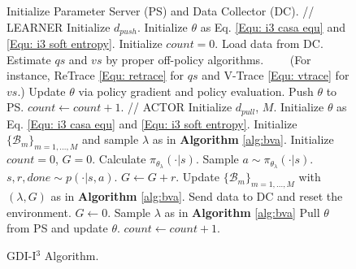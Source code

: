 \documentclass[nohyperref]{article}
\theoremstyle{plain}
\begin{document}
\begin{figure}[ht]
  \centering
  \begin{minipage}{.7\linewidth}
    \begin{algorithm}[H]
      \caption{GDI-I$^3$ Algorithm.}  
          \begin{algorithmic}
            \STATE Initialize Parameter Server (PS) and Data Collector (DC).
            \STATE
            \STATE // LEARNER
            \STATE Initialize $d_{push}$.
            \STATE Initialize $\theta$ as Eq. \eqref{Equ: i3 casa equ} and \eqref{Equ: i3 soft entropy}.
            \STATE Initialize $count = 0$.
                \STATE Load data from DC.
                \STATE Estimate $qs$ and $vs$ by proper off-policy algorithms.
                \STATE \ \ \ \ (For instance, ReTrace \eqref{Equ: retrace} for $qs$ and V-Trace \eqref{Equ: vtrace} for $vs$.)
                \STATE Update $\theta$ via policy gradient and policy evaluation.
                    \STATE Push $\theta$ to PS.
                \ENDIF
                \STATE $count \leftarrow count + 1$.
            \ENDWHILE
            \STATE
            \STATE // ACTOR
            \STATE Initialize $d_{pull}$, $M$.
            \STATE Initialize $\theta$ as Eq. \eqref{Equ: i3 casa equ} and \eqref{Equ: i3 soft entropy}.
            \STATE Initialize $\{\mathcal{B}_m\}_{m=1,...,M}$ and sample $\lambda$ as in \textbf{Algorithm} \ref{alg:bva}.
            \STATE Initialize $count = 0$, $G = 0$.
                \STATE Calculate $\pi_{\theta_{\lambda}}(\cdot | s)$.
                \STATE Sample $a \sim \pi_{\theta_{\lambda}}(\cdot | s)$.
                \STATE $s, r, done \sim p(\cdot | s, a)$.
                \STATE $G \leftarrow G + r$.
                    \STATE Update $\{\mathcal{B}_m\}_{m=1,...,M}$ with $(\lambda, G)$ as in \textbf{Algorithm} \ref{alg:bva}.
                    \STATE Send data to DC and reset the environment.
                    \STATE $G \leftarrow 0$.
                    \STATE Sample $\lambda$ as in \textbf{Algorithm} \ref{alg:bva}
                \ENDIF
                    \STATE Pull $\theta$ from PS and update $\theta$.
                \ENDIF
                \STATE $count \leftarrow count + 1$.
            \ENDWHILE
          \end{algorithmic}
        \label{alg:i3}
    \end{algorithm}
  \end{minipage}
\end{figure}
\end{document}
